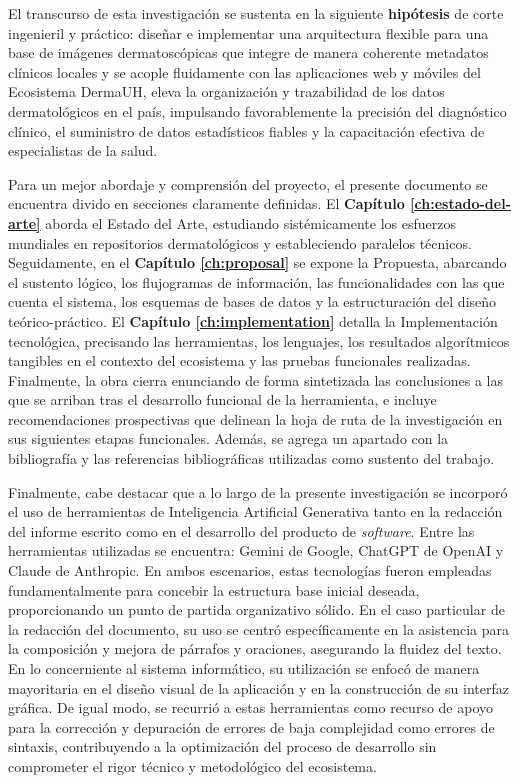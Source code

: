 El transcurso de esta investigación se sustenta en la siguiente \textbf{hipótesis} de corte ingenieril y 
práctico: diseñar e implementar una arquitectura flexible para una base de imágenes dermatoscópicas 
que integre de manera coherente metadatos clínicos locales y se acople fluidamente con las aplicaciones 
web y móviles del Ecosistema DermaUH, eleva la organización y trazabilidad de los 
datos dermatológicos en el país, impulsando favorablemente la precisión del diagnóstico clínico, el 
suministro de datos estadísticos fiables y la capacitación efectiva de especialistas de la salud.

Para un mejor abordaje y comprensión del proyecto, el presente documento se encuentra divido en secciones 
claramente definidas. El \textbf{Capítulo \ref{ch:estado-del-arte}} aborda el Estado del Arte, estudiando 
sistémicamente los esfuerzos mundiales en repositorios dermatológicos y estableciendo paralelos técnicos. 
Seguidamente, en el \textbf{Capítulo \ref{ch:proposal}} se expone la Propuesta, abarcando el sustento lógico, 
los flujogramas de información, las funcionalidades con las que cuenta el sistema, los esquemas de bases 
de datos y la estructuración del diseño 
teórico-práctico. El \textbf{Capítulo \ref{ch:implementation}} detalla la Implementación tecnológica, 
precisando las herramientas, los lenguajes, los resultados algorítmicos tangibles en el contexto del 
ecosistema y las pruebas funcionales realizadas. Finalmente, la obra cierra enunciando de forma sintetizada las conclusiones a las que se arriban 
tras el desarrollo funcional de la herramienta, e incluye recomendaciones prospectivas que delinean la hoja de 
ruta de la investigación en sus siguientes etapas funcionales. Además, se agrega un apartado con la 
bibliografía y las referencias bibliográficas utilizadas como sustento del trabajo.

Finalmente, cabe destacar que a lo largo de la presente investigación se incorporó el uso de herramientas 
de Inteligencia Artificial Generativa tanto en la redacción del informe escrito como en el desarrollo 
del producto de \textit{software}. Entre las herramientas utilizadas se encuentra: Gemini de Google, ChatGPT de OpenAI 
y Claude de Anthropic. En ambos escenarios, estas tecnologías fueron empleadas fundamentalmente 
para concebir la estructura base inicial deseada, proporcionando un punto de partida organizativo sólido. 
En el caso particular de la redacción del documento, su uso se centró específicamente en la asistencia para 
la composición y mejora de párrafos y oraciones, asegurando la fluidez del texto.
En lo concerniente al sistema informático, su utilización se enfocó de manera mayoritaria en el diseño visual de 
la aplicación y en la construcción de su interfaz gráfica. De igual modo, se recurrió a estas herramientas 
como recurso de apoyo para la corrección y depuración de errores de baja complejidad como errores de sintaxis, 
contribuyendo a la optimización del proceso de desarrollo sin comprometer 
el rigor técnico y metodológico del ecosistema.
